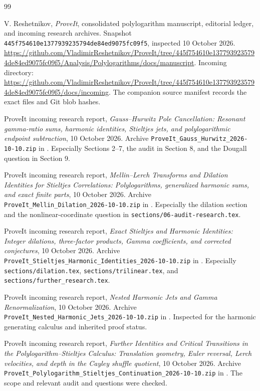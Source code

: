 \documentclass[11pt,a4paper]{article}
\numberwithin{equation}{section}
\theoremstyle{definition}
\theoremstyle{remark}
\newcommand{\src}[1]{\nolinkurl{#1}}
\newcommand{\pin}{\texttt{445f754610e1377939235794de84ed9075fc09f5}}
\begin{document}
\begin{thebibliography}{99}

V. Reshetnikov, \emph{ProveIt}, consolidated polylogarithm manuscript,
editorial ledger, and incoming research archives. Snapshot
\pin, inspected 10 October 2026.
\url{https://github.com/VladimirReshetnikov/ProveIt/tree/445f754610e1377939235794de84ed9075fc09f5/Analysis/Polylogarithms/docs/manuscript}.
Incoming directory:
\url{https://github.com/VladimirReshetnikov/ProveIt/tree/445f754610e1377939235794de84ed9075fc09f5/docs/incoming}.
The companion source manifest records the exact files and Git blob hashes.

ProveIt incoming research report,
\emph{Gauss--Hurwitz Pole Cancellation: Resonant gamma-ratio sums,
harmonic identities, Stieltjes jets, and polylogarithmic endpoint
subtraction}, 10 October 2026.
Archive \src{ProveIt_Gauss_Hurwitz_2026-10-10.zip} in \cite{repo}.
Especially Sections 2--7, the audit in Section 8, and the Dougall
question in Section 9.

ProveIt incoming research report,
\emph{Mellin--Lerch Transforms and Dilation Identities for Stieltjes
Correlations: Polylogarithms, generalized harmonic sums, and exact
finite parts}, 10 October 2026.
Archive \src{ProveIt_Mellin_Dilation_2026-10-10.zip} in \cite{repo}.
Especially the dilation section and the nonlinear-coordinate question
in \src{sections/06-audit-research.tex}.

ProveIt incoming research report,
\emph{Exact Stieltjes and Harmonic Identities: Integer dilations,
three-factor products, Gamma coefficients, and corrected conjectures},
10 October 2026.
Archive \src{ProveIt_Stieltjes_Harmonic_Identities_2026-10-10.zip}
in \cite{repo}. Especially \src{sections/dilation.tex},
\src{sections/trilinear.tex}, and \src{sections/further_research.tex}.

ProveIt incoming research report,
\emph{Nested Harmonic Jets and Gamma Renormalization},
10 October 2026.
Archive \src{ProveIt_Nested_Harmonic_Jets_2026-10-10.zip} in \cite{repo}.
Inspected for the harmonic generating calculus and inherited proof status.

ProveIt incoming research report,
\emph{Further Identities and Critical Transitions in the
Polylogarithm--Stieltjes Calculus: Translation geometry, Euler reversal,
Lerch velocities, and depth in the Cayley shuffle quotient},
10 October 2026.
Archive \src{ProveIt_Polylogarithm_Stieltjes_Continuation_2026-10-10.zip}
in \cite{repo}. The scope and relevant audit and questions were checked.


\end{thebibliography}
\end{document}
